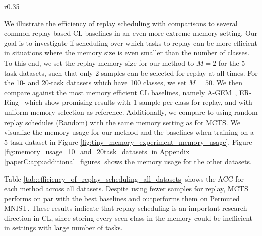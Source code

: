 \begin{wrapfigure}[12]{r}{0.35\textwidth}
	\centering
	\setlength{\figwidth}{0.33\textwidth}
	\setlength{\figheight}{.14\textheight}
	\vspace{-3mm}
	
	\vspace{-3mm}
	\captionsetup{width=.98\linewidth}
	\caption{
		Number of replayed samples/task for the 5-task datasets in the tiny memory setting. Ours use $M=2$ samples for replay, while the baselines increment their memory per task.
	}
	\label{fig:tiny_memory_experiment_memory_usage}
\end{wrapfigure}
We illustrate the efficiency of replay scheduling with comparisons to several common replay-based CL baselines in an even more extreme memory setting.
Our goal is to investigate if scheduling over which tasks to replay can be more efficient in situations where the memory size is even smaller than the number of classes. %
To this end, we set the replay memory size for our method
to $M=2$ for the 5-task datasets, such that only 2 samples can be selected for replay at all times. For the 10- and 20-task datasets which have 100 classes, we set $M=50$. We then compare against the most memory efficient CL baselines, namely A-GEM~, ER-Ring~ which show promising results with 1 sample per class for replay, %
and with uniform memory selection as reference. 
Additionally, we compare to using random replay schedules (Random) with the same memory setting as for MCTS.
We visualize the memory usage for our method and the baselines when training on a 5-task dataset in Figure \ref{fig:tiny_memory_experiment_memory_usage}. 
Figure \ref{fig:memory_usage_10_and_20task_datasets} in Appendix \ref{paperC:app:additional_figures} shows the memory usage for the other datasets. 

Table \ref{tab:efficiency_of_replay_scheduling_all_datasets} shows the ACC for each method across all datasets. Despite using fewer samples for replay, MCTS performs on par with the best baselines and outperforms them on Permuted MNIST.  
These results indicate that replay scheduling is an important research direction in CL, since storing every seen class in the memory could be inefficient in settings with large number of tasks. 



